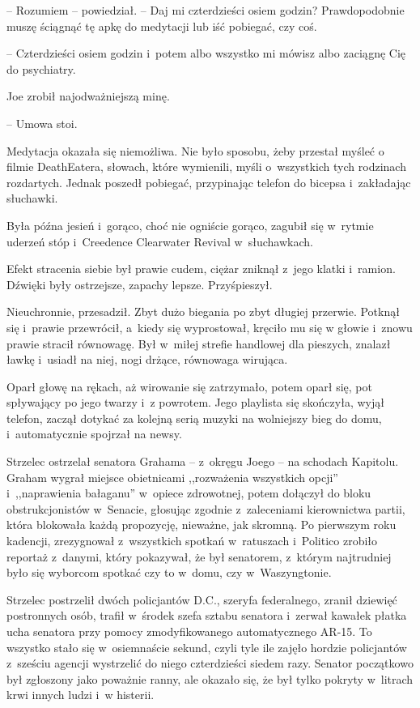 \documentclass[oneside,polish,11pt,sfheadings]{mwbk}
\begin{document}
-- Rozumiem -- powiedział. -- Daj mi czterdzieści osiem godzin?
Prawdopodobnie muszę ściągnąć tę apkę do medytacji lub iść pobiegać, czy
coś.

-- Czterdzieści osiem godzin i~potem albo wszystko mi mówisz albo
zaciągnę Cię do psychiatry.

Joe zrobił najodważniejszą minę.

-- Umowa stoi.

Medytacja okazała się niemożliwa. Nie było sposobu, żeby przestał myśleć
o filmie DeathEatera, słowach, które wymienili, myśli o~wszystkich tych
rodzinach rozdartych. Jednak poszedł pobiegać, przypinając telefon do
bicepsa i~zakładając słuchawki.

Była późna jesień i~gorąco, choć nie ogniście gorąco, zagubił się w~rytmie uderzeń stóp i~Creedence Clearwater Revival w~słuchawkach.

Efekt stracenia siebie był prawie cudem, ciężar zniknął z~jego klatki i~ramion. Dźwięki były ostrzejsze, zapachy lepsze. Przyśpieszył.

Nieuchronnie, przesadził. Zbyt dużo biegania po zbyt długiej przerwie.
Potknął się i~prawie przewrócił, a~kiedy się wyprostował, kręciło mu się
w głowie i~znowu prawie stracił równowagę. Był w~miłej strefie handlowej
dla pieszych, znalazł ławkę i~usiadł na niej, nogi drżące, równowaga
wirująca.

Oparł głowę na rękach, aż wirowanie się zatrzymało, potem oparł się, pot
spływający po jego twarzy i~z powrotem. Jego playlista się skończyła,
wyjął telefon, zaczął dotykać za kolejną serią muzyki na wolniejszy bieg
do domu, i~automatycznie spojrzał na newsy.

Strzelec ostrzelał senatora Grahama -- z~okręgu Joego -- na schodach
Kapitolu. Graham wygrał miejsce obietnicami ,,rozważenia wszystkich
opcji'' i~,,naprawienia bałaganu'' w~opiece zdrowotnej, potem dołączył
do bloku obstrukcjonistów w~Senacie, głosując zgodnie z~zaleceniami
kierownictwa partii, która blokowała każdą propozycję, nieważne, jak
skromną. Po pierwszym roku kadencji, zrezygnował z~wszystkich spotkań w~ratuszach i~Politico zrobiło reportaż z~danymi, który pokazywał, że był
senatorem, z~którym najtrudniej było się wyborcom spotkać czy to w~domu,
czy w~Waszyngtonie.

Strzelec postrzelił dwóch policjantów D.C., szeryfa federalnego, zranił
dziewięć postronnych osób, trafił w~środek szefa sztabu senatora i~zerwał kawałek płatka ucha senatora przy pomocy zmodyfikowanego
automatycznego AR-15. To wszystko stało się w~osiemnaście sekund, czyli
tyle ile zajęło hordzie policjantów z~sześciu agencji wystrzelić do
niego czterdzieści siedem razy. Senator początkowo był zgłoszony jako
poważnie ranny, ale okazało się, że był tylko pokryty w~litrach krwi
innych ludzi i~w histerii.
\end{document}
